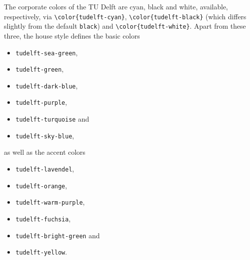 The corporate colors of the TU Delft are cyan, black and white, available, respectively, via \texttt{\textbackslash color\{{\color{tudelft-cyan}tudelft-cyan}\}}, \texttt{\textbackslash color\{{\color{tudelft-black}tudelft-black}\}} (which differs slightly from the default \texttt{black}) and \texttt{\textbackslash color\{tudelft-white\}}. Apart from these three, the house style defines the basic colors
\begin{itemize}
\itemsep 0pt
\parskip 0pt
\item\texttt{\color{tudelft-sea-green}tudelft-sea-green},
\item\texttt{\color{tudelft-green}tudelft-green},
\item\texttt{\color{tudelft-dark-blue}tudelft-dark-blue},
\item\texttt{\color{tudelft-purple}tudelft-purple},
\item\texttt{\color{tudelft-turquoise}tudelft-turquoise} and
\item\texttt{\color{tudelft-sky-blue}tudelft-sky-blue},
\end{itemize}
as well as the accent colors
\begin{itemize}
\itemsep 0pt
\parskip 0pt
\item\texttt{\color{tudelft-lavendel}tudelft-lavendel},
\item\texttt{\color{tudelft-orange}tudelft-orange},
\item\texttt{\color{tudelft-warm-purple}tudelft-warm-purple},
\item\texttt{\color{tudelft-fuchsia}tudelft-fuchsia},
\item\texttt{\color{tudelft-bright-green}tudelft-bright-green} and
\item\texttt{\color{tudelft-yellow}tudelft-yellow}.
\end{itemize}


